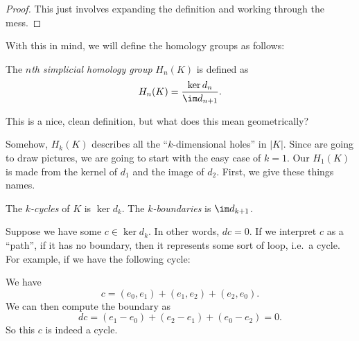 \documentclass[a4paper]{article}
\begin{document}
\begin{proof}
  This just involves expanding the definition and working through the mess. %
\end{proof}

With this in mind, we will define the homology groups as follows:
\begin{defi}
  The \emph{$n$th simplicial homology group} $H_n(K)$ is defined as
  \[
    H_n(K) = \frac{\ker d_n}{\im d_{n + 1}}.
  \]
\end{defi}
This is a nice, clean definition, but what does this mean geometrically?

Somehow, $H_k(K)$ describes all the ``$k$-dimensional holes'' in $|K|$. Since are going to draw pictures, we are going to start with the easy case of $k = 1$. Our $H_1(K)$ is made from the kernel of $d_1$ and the image of $d_2$. First, we give these things names.

\begin{defi}
  The \emph{$k$-cycles} of $K$ is $\ker d_k$. The \emph{$k$-boundaries} is $\im d_{k + 1}$.
\end{defi}

Suppose we have some $c \in \ker d_k$. In other words, $dc = 0$. If we interpret $c$ as a ``path'', if it has no boundary, then it represents some sort of loop, i.e.\ a cycle. For example, if we have the following cycle:
\begin{center}
\end{center}
We have
\[
  c = (e_0, e_1) + (e_1, e_2) + (e_2, e_0).
\]
We can then compute the boundary as
\[
  dc = (e_1 - e_0) + (e_2 - e_1) + (e_0 - e_2) = 0.
\]
So this $c$ is indeed a cycle.
\end{document}
